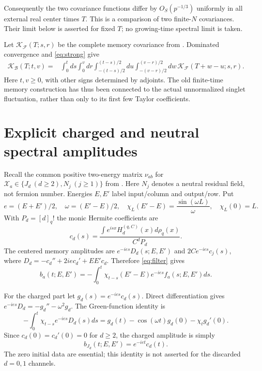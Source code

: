 \documentclass[11pt]{article}
\newcommand{\FF}{\mathcal F}
\newcommand{\BB}{\mathcal B}
\newcommand{\HH}{H^{(q,C)}}
\begin{document}
Consequently the two covariance functions differ by $O_S(p^{-1/3})$
uniformly in all external real center times $T$. This is a comparison
of two finite-$N$ covariances. Their limit below is asserted for
fixed $T$; no growing-time spectral limit is taken.

Let $\mathcal K_\FF(T;s,r)$ be the complete memory covariance from
\cite{Joint}. Dominated convergence and \eqref{eq:strong} give
\begin{align}
 \mathcal K_\BB(T;t,v)
 ={}&\int_0^t ds\int_0^v dr
 \int_{-(t-s)/2}^{(t-s)/2}du
 \int_{-(v-r)/2}^{(v-r)/2}dw\,
 \mathcal K_\FF(T+w-u;s,r).\label{eq:cov}
\end{align}
Here $t,v\ge0$, with other signs determined by adjoints.
The old finite-time memory construction has thus been connected
to the actual unnormalized singlet fluctuation, rather than only
to its first few Taylor coefficients.

\newpage
\section{Explicit charged and neutral spectral amplitudes}
Recall the common positive two-energy matrix $\nu_{ab}$ for
$\mathcal X_a\in\{J_d\ (d\ge2),N_j\ (j\ge1)\}$ from \cite{Joint}.
Here $N_j$ denotes a neutral residual field, not fermion number.
Energies $E,E'$ label input/column and output/row. Put
\begin{equation}
 e=(E+E')/2,\quad\omega=(E'-E)/2,\quad
 \chi_L(E'-E)=\frac{\sin(\omega L)}\omega,\quad\chi_L(0)=L.
\end{equation}
With $P_d=[d]_q!$ the monic Hermite coefficients are
\begin{equation}
 c_d(s)=\frac{\int e^{isx}\HH_d(x)d\rho_q(x)}{C^dP_d}.
\end{equation}
The centered memory amplitudes are
$e^{-ies}D_d(s;E,E')$ and $2Ce^{-ies}c_j(s)$, where
$D_d=-c_d''+2ie c_d'+EE'c_d$. Therefore \eqref{eq:filter} gives
\begin{equation}
 b_a(t;E,E')=-\int_0^t\chi_{t-s}(E'-E)e^{-ies}f_a(s;E,E')ds.
 \label{eq:bint}
\end{equation}

For the charged part let $g_d(s)=e^{-ies}c_d(s)$. Direct differentiation
gives $e^{-ies}D_d=-g_d''-\omega^2g_d$. The Green-function identity is
\begin{equation}
 -\int_0^t\chi_{t-s}e^{-ies}D_d(s)ds
 =g_d(t)-\cos(\omega t)g_d(0)-\chi_tg_d'(0).
\end{equation}
Since $c_d(0)=c_d'(0)=0$ for $d\ge2$, the charged amplitude is simply
\begin{equation}
 \boxed{b_{J_d}(t;E,E')=e^{-iet}c_d(t).}\label{eq:bcharged}
\end{equation}
The zero initial data are essential; this identity is not asserted
for the discarded $d=0,1$ channels.
\end{document}
